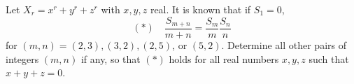 Let $X_r=x^r+y^r+z^r$ with $x,y,z$ real. It is known that if $S_1=0$,  \[(*)\quad\frac{S_{m+n}}{m+n}=\frac{S_m}{m}\frac{S_n}{n}\]for $(m,n)=(2,3),(3,2),(2,5)$,  or $(5,2)$. Determine all other pairs of integers $(m,n)$ if any, so that $(*)$ holds for all real numbers $x,y,z$ such that $x+y+z=0$.